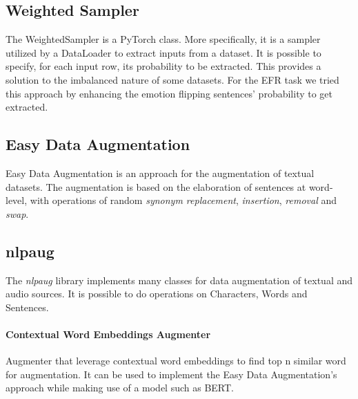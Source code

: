 \documentclass[11pt,table,xcdraw]{article}
\begin{document}
\subsection{Weighted Sampler} \label{weighted_sampler}
The WeightedSampler is a PyTorch class. More specifically, it is a sampler utilized by a DataLoader to extract inputs from a dataset. It is possible to specify, for each input row, its probability to be extracted. This provides a solution to the imbalanced nature of some datasets. For the EFR task we tried this approach by enhancing the emotion flipping sentences' probability to get extracted.

\subsection{Easy Data Augmentation}
Easy Data Augmentation \cite{wei2019eda} is an approach for the augmentation of textual datasets. The augmentation is based on the elaboration of sentences at word-level, with operations of random \textit{synonym replacement}, \textit{insertion}, \textit{removal} and \textit{swap}.

\subsection{nlpaug} \label{nlpaug}
The \textit{nlpaug} library \cite{ma2019nlpaug} implements many classes for data augmentation of textual and audio sources. It is possible to do operations on Characters, Words and Sentences.

\paragraph{Contextual Word Embeddings Augmenter}
Augmenter that leverage contextual word embeddings to find top n similar word for augmentation. It can be used to implement the Easy Data Augmentation's approach while making use of a model such as BERT.


\end{document}

